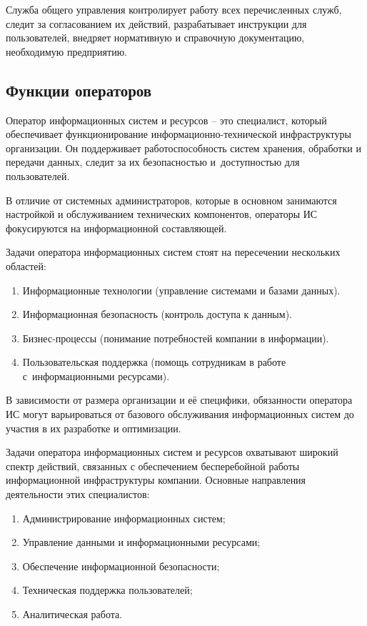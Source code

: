 \documentclass{ou}
\begin{document}
Служба общего управления контролирует работу всех перечисленных служб, следит за согласованием их действий, разрабатывает инструкции для пользователей, внедряет нормативную и справочную документацию, необходимую предприятию\cite{studfile_user}.
\subsection{Функции операторов}
Оператор информационных систем и ресурсов -- это специалист, который обеспечивает функционирование информационно-технической инфраструктуры организации. Он поддерживает работоспособность систем хранения, обработки и передачи данных, следит за их безопасностью и~доступностью для пользователей\cite{sky_operator}. 

В отличие от системных администраторов, которые в основном занимаются настройкой и обслуживанием технических компонентов, операторы ИС фокусируются на информационной составляющей.

Задачи оператора информационных систем стоят на пересечении нескольких областей:
\begin{enumerate}[leftmargin=0em, itemindent=3.75em, nosep, label=\arabic*)]
\item Информационные технологии (управление системами и базами данных).
\item Информационная безопасность (контроль доступа к данным).
\item Бизнес-процессы (понимание потребностей компании в информации).
\item Пользовательская поддержка (помощь сотрудникам в работе с~информационными ресурсами)\cite{sky_operator}.
\end{enumerate}

В зависимости от размера организации и её специфики, обязанности оператора ИС могут варьироваться от базового обслуживания информационных систем до участия в их разработке и оптимизации.

Задачи оператора информационных систем и ресурсов охватывают широкий спектр действий, связанных с обеспечением бесперебойной работы информационной инфраструктуры компании. Основные направления деятельности этих специалистов:
\begin{enumerate}[leftmargin=0em, itemindent=3.75em, nosep, label=\arabic*)]
\item Администрирование информационных систем;
\item Управление данными и информационными ресурсами;
\item Обеспечение информационной безопасности;
\item Техническая поддержка пользователей;
\item Аналитическая работа\cite{sky_operator}.
\end{enumerate}
\end{document}
